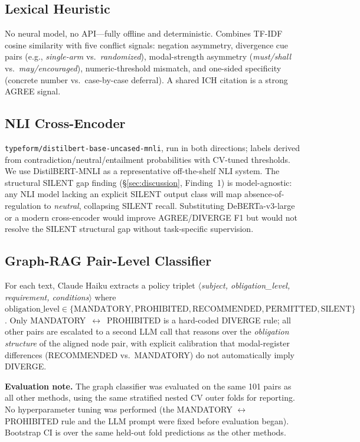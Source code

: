 \documentclass[sigconf]{acmart}
\begin{document}
\subsection{Lexical Heuristic}

No neural model, no API---fully offline and deterministic. Combines TF-IDF
cosine similarity with five conflict signals: negation asymmetry, divergence
cue pairs (e.g., \textit{single-arm} vs.\ \textit{randomized}), modal-strength
asymmetry (\textit{must/shall} vs.\ \textit{may/encouraged}),
numeric-threshold mismatch, and one-sided specificity (concrete number
vs.\ case-by-case deferral). A shared ICH citation is a strong AGREE signal.

\subsection{NLI Cross-Encoder}

\texttt{typeform/distilbert-base-uncased-mnli}, run in both directions; labels
derived from contradiction/neutral/entailment probabilities with CV-tuned
thresholds. We use DistilBERT-MNLI as a representative off-the-shelf NLI
system. The structural SILENT gap finding (\S\ref{sec:discussion}, Finding~1)
is model-agnostic: any NLI model lacking an explicit SILENT output class will
map absence-of-regulation to \textit{neutral}, collapsing SILENT recall.
Substituting DeBERTa-v3-large or a modern cross-encoder would improve
AGREE/DIVERGE F1 but would not resolve the SILENT structural gap without
task-specific supervision.

\subsection{Graph-RAG Pair-Level Classifier}

For each text, Claude Haiku extracts a policy triplet
$\langle$\textit{subject, obligation\_level, requirement, conditions}$\rangle$
where $\text{obligation\_level} \in \{\text{MANDATORY}, \text{PROHIBITED},
\text{RECOMMENDED}, \text{PERMITTED}, \text{SILENT}\}$. Only
MANDATORY~$\leftrightarrow$~PROHIBITED is a hard-coded DIVERGE rule; all other
pairs are escalated to a second LLM call that reasons over the
\textit{obligation structure} of the aligned node pair, with explicit
calibration that modal-register differences (RECOMMENDED vs.\ MANDATORY) do not
automatically imply DIVERGE.

\textbf{Evaluation note.} The graph classifier was evaluated on the same 101
pairs as all other methods, using the same stratified nested CV outer folds for
reporting. No hyperparameter tuning was performed (the MANDATORY
$\leftrightarrow$ PROHIBITED rule and the LLM prompt were fixed before
evaluation began). Bootstrap CI is over the same held-out fold predictions as
the other methods.
\end{document}
